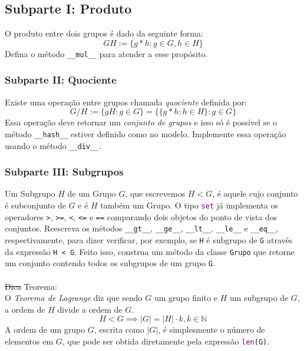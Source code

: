 \documentclass[12pt]{article}
\newcommand{\mono}[1]{\texttt{#1}}
\newcommand{\type}[1]{\textcolor{purple}{\mono{#1}}}
\newcommand{\spm}[1]{\mono{\_\_#1\_\_}}
\begin{document}
	\subsection{Subparte I: Produto}
	O produto entre dois grupos é dado da seguinte forma:
	\[GH := \{g \ast h : g \in G, h\in H\} \]
	Defina o método \spm{mul} para atender a esse propósito.
	
	\subsubsection{Subparte II: Quociente}
	Existe uma operação entre grupos chamada \emph{quociente} definida por:
	\[G/H := \{gH : g \in G\} = \{\{g \ast h: h \in H\} : g \in G\}\]
	Essa operação deve retornar um \emph{conjunto de grupos} e isso só é possível se o método \spm{hash} estiver definido como no modelo. Implemente essa operação usando o método \spm{div}.
	
	\subsubsection{Subparte III: Subgrupos}
	Um Subgrupo $H$ de um Grupo $G$, que escrevemos $H < G$, é aquele cujo conjunto é subconjunto de $G$ e é $H$ também um Grupo. O tipo \type{set} já implementa os operadores \mono{>}, \mono{>=}, \mono{<}, \mono{<=} e \mono{==} comparando dois objetos do ponto de vista dos conjuntos. Reescreva os métodos \spm{gt}, \spm{ge}, \spm{lt}, \spm{le} e \spm{eq}, respectivamente, para dizer verificar, por exemplo, se \mono{H} é subgrupo de \mono{G} através da expressão \mono{H < G}.
	Feito isso, construa um método da classe \mono{Grupo} que retorne um conjunto contendo todos os subgrupos de um grupo \mono{G}.\\
	\\
	\st{Dica} Teorema: \\
	O \emph{Teorema de Lagrange} diz que sendo $G$ um grupo finito e $H$ um subgrupo de $G$, a ordem de $H$ divide a ordem de $G$.
	\[H < G \implies |G| = |H| \cdot k, k \in \mathbb{N}\]
	A ordem de um grupo $G$, escrita como $|G|$, é simplesmente o número de elementos em $G$, que pode ser obtida diretamente pela expressão \type{len}\mono{(G)}.
	
	\pagebreak
	
\end{document}
